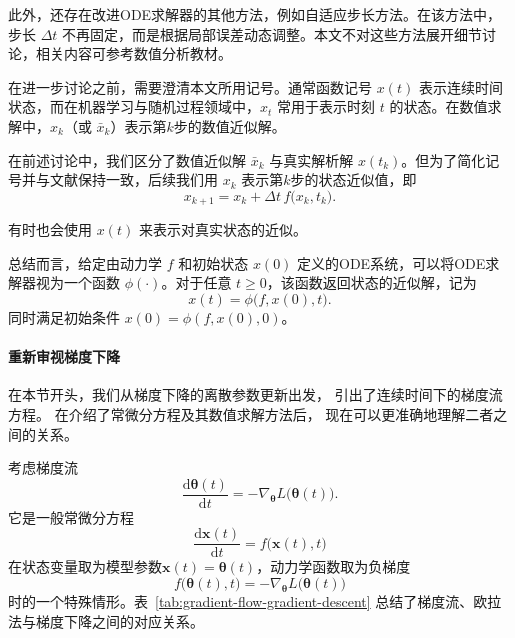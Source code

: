 \documentclass[UTF8,a4paper,zihao=-4,oneside,openany]{ctexbook}
\begin{document}
此外，还存在改进ODE求解器的其他方法，例如自适应步长方法。在该方法中，步长 $\Delta t$ 不再固定，而是根据局部误差动态调整。本文不对这些方法展开细节讨论，相关内容可参考数值分析教材。

在进一步讨论之前，需要澄清本文所用记号。通常函数记号 $x(t)$ 表示连续时间状态，而在机器学习与随机过程领域中，$x_t$ 常用于表示时刻 $t$ 的状态。在数值求解中，$x_k$（或 $\bar{x}_k$）表示第$k$步的数值近似解。

在前述讨论中，我们区分了数值近似解 $\bar{x}_k$ 与真实解析解 $x(t_k)$。但为了简化记号并与文献保持一致，后续我们用 $x_k$ 表示第$k$步的状态近似值，即
\begin{equation}
x_{k+1}
=
x_k
+
\Delta t\,
f\bigl(x_k,t_k\bigr).
\label{eq:euler-method-simplified}
\end{equation}

有时也会使用 $x(t)$ 来表示对真实状态的近似。

总结而言，给定由动力学 $f$ 和初始状态 $x(0)$ 定义的ODE系统，可以将ODE求解器视为一个函数 $\phi(\cdot)$。对于任意 $t\ge 0$，该函数返回状态的近似解，记为
\begin{equation}
x(t)
=
\phi\bigl(f,x(0),t\bigr).
\label{eq:ode-solution-operator}
\end{equation}
同时满足初始条件 $x(0)=\phi(f,x(0),0)$。


\paragraph{重新审视梯度下降}

在本节开头，我们从梯度下降的离散参数更新出发，
引出了连续时间下的梯度流方程。
在介绍了常微分方程及其数值求解方法后，
现在可以更准确地理解二者之间的关系。

考虑梯度流
\begin{equation}
    \frac{\mathrm{d}\boldsymbol{\theta}(t)}
    {\mathrm{d}t}
    =
    -
    \nabla_{\boldsymbol{\theta}}
    L\bigl(\boldsymbol{\theta}(t)\bigr).
    \label{eq:gradient-flow-revisited}
\end{equation}
它是一般常微分方程\[
    \frac{\mathrm{d}\boldsymbol{x}(t)}{\mathrm{d}t}
    =
    f\bigl(\boldsymbol{x}(t),t\bigr)
\]在状态变量取为模型参数\(\boldsymbol{x}(t)=\boldsymbol{\theta}(t)\)，动力学函数取为负梯度
\[
    f\bigl(\boldsymbol{\theta}(t),t\bigr)
    =
    -
    \nabla_{\boldsymbol{\theta}}
    L\bigl(\boldsymbol{\theta}(t)\bigr)
\]
时的一个特殊情形。表~\ref{tab:gradient-flow-gradient-descent}
总结了梯度流、欧拉法与梯度下降之间的对应关系。
\end{document}
